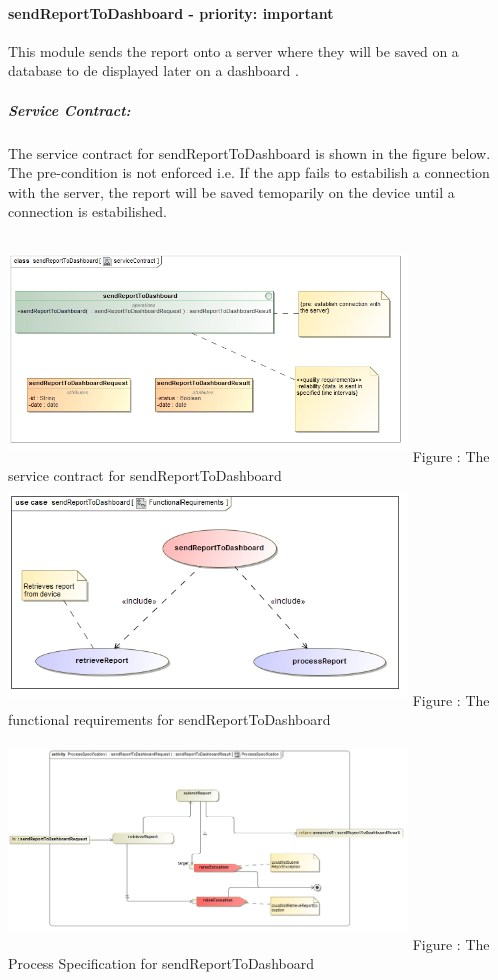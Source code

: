 \documentclass[hidelinks, 12pt, oneside]{article}
\begin{document}
		\paragraph{ sendReportToDashboard - priority: important}
		This module sends the report onto a server where they will be saved on a database to de displayed later on a dashboard .\newline
		\subparagraph{Service Contract:}
			The service contract for sendReportToDashboard is shown in the figure below. The pre-condition is not enforced i.e. If the app fails to estabilish a connection with the server, the report will be saved temoparily on the device until a connection is estabilished.\\\\
		\includegraphics[width=400px,height=220px]{img/serviceContractSendReportToDashboard.jpg}
			Figure : The service contract for sendReportToDashboard\newline \newline \newline
		\includegraphics[width=400px,height=220px]{img/functionalRequirementsSendReportToDashboard.jpg}
			Figure : The functional requirements for sendReportToDashboard\newline
		\includegraphics[width=400px,height=220px]{img/ProcessSpecificationSendResportToDashboard.jpg}
						Figure : The Process Specification for sendReportToDashboard\newline
			\newpage
\end{document}
